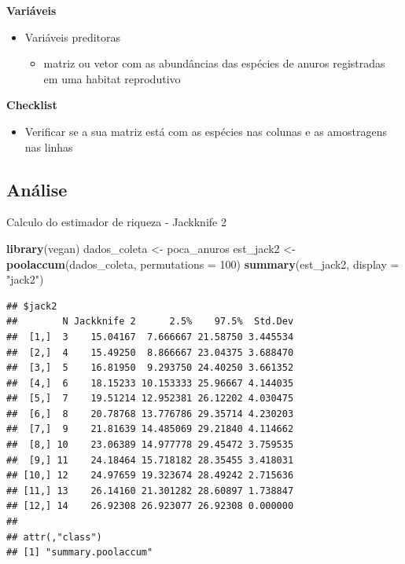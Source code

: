 \documentclass[
]{book}
\newenvironment{Shaded}{\begin{snugshade}}{\end{snugshade}}
\newcommand{\DataTypeTok}[1]{\textcolor[rgb]{0.13,0.29,0.53}{#1}}
\newcommand{\DecValTok}[1]{\textcolor[rgb]{0.00,0.00,0.81}{#1}}
\newcommand{\KeywordTok}[1]{\textcolor[rgb]{0.13,0.29,0.53}{\textbf{#1}}}
\newcommand{\NormalTok}[1]{#1}
\newcommand{\StringTok}[1]{\textcolor[rgb]{0.31,0.60,0.02}{#1}}
\providecommand{\tightlist}{%
  \setlength{\itemsep}{0pt}\setlength{\parskip}{0pt}}
\begin{document}
\textbf{Variáveis}

\begin{itemize}
\tightlist
\item
  Variáveis preditoras

  \begin{itemize}
  \tightlist
  \item
    matriz ou vetor com as abundâncias das espécies de anuros registradas em uma habitat reprodutivo
  \end{itemize}
\end{itemize}

\textbf{Checklist}

\begin{itemize}
\tightlist
\item
  Verificar se a sua matriz está com as espécies nas colunas e as amostragens nas linhas
\end{itemize}

\hypertarget{anuxe1lise-6}{%
\subsection{Análise}\label{anuxe1lise-6}}

Calculo do estimador de riqueza - Jackknife 2

\begin{Shaded}
\begin{Highlighting}[]
\KeywordTok{library}\NormalTok{(vegan)}
\NormalTok{dados_coleta <-}\StringTok{ }\NormalTok{poca_anuros}
\NormalTok{est_jack2 <-}\StringTok{ }\KeywordTok{poolaccum}\NormalTok{(dados_coleta, }\DataTypeTok{permutations =} \DecValTok{100}\NormalTok{)}
\KeywordTok{summary}\NormalTok{(est_jack2, }\DataTypeTok{display =} \StringTok{"jack2"}\NormalTok{)}
\end{Highlighting}
\end{Shaded}

\begin{verbatim}
## $jack2
##        N Jackknife 2      2.5%    97.5%  Std.Dev
##  [1,]  3    15.04167  7.666667 21.58750 3.445534
##  [2,]  4    15.49250  8.866667 23.04375 3.688470
##  [3,]  5    16.81950  9.293750 24.40250 3.661352
##  [4,]  6    18.15233 10.153333 25.96667 4.144035
##  [5,]  7    19.51214 12.952381 26.12202 4.030475
##  [6,]  8    20.78768 13.776786 29.35714 4.230203
##  [7,]  9    21.81639 14.485069 29.21840 4.114662
##  [8,] 10    23.06389 14.977778 29.45472 3.759535
##  [9,] 11    24.18464 15.718182 28.35455 3.418031
## [10,] 12    24.97659 19.323674 28.49242 2.715636
## [11,] 13    26.14160 21.301282 28.60897 1.738847
## [12,] 14    26.92308 26.923077 26.92308 0.000000
## 
## attr(,"class")
## [1] "summary.poolaccum"
\end{verbatim}
\end{document}
